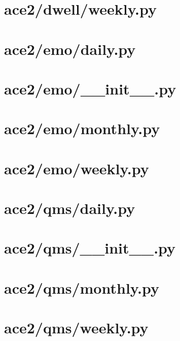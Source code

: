 \documentclass{article}
\begin{document}
\section*{ace2/dwell/weekly.py}


\section*{ace2/emo/daily.py}


\section*{ace2/emo/\_\_init\_\_.py}


\section*{ace2/emo/monthly.py}


\section*{ace2/emo/weekly.py}


\section*{ace2/qms/daily.py}


\section*{ace2/qms/\_\_init\_\_.py}


\section*{ace2/qms/monthly.py}


\section*{ace2/qms/weekly.py}

\end{document}
